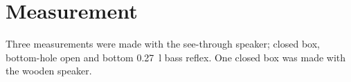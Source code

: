 \section{Measurement}
Three measurements were made with the see-through speaker; closed box, bottom-hole open and bottom \SI{0.27}{\litre} bass reflex. One closed box was made with the wooden speaker.